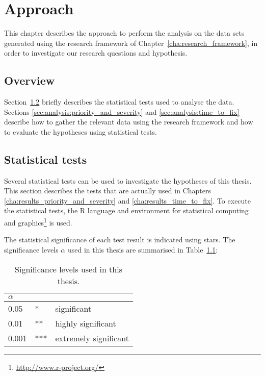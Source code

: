 
\chapter{Approach} %
\label{cha:data_analysis}
This chapter describes the approach to perform the analysis on the data sets generated using the research framework of Chapter~\ref{cha:research_framework}, in order to investigate our research questions and hypothesis.

\section{Overview} %
\label{sec:overview}
Section~\ref{sec:statistical_tests} briefly describes the statistical tests used to analyse the data. Sections \ref{sec:analysis:priority_and_severity} and \ref{sec:analysis:time_to_fix} describe how to gather the relevant data using the research framework and how to evaluate the hypotheses using statistical tests.

\section{Statistical tests} %
\label{sec:statistical_tests}
Several statistical tests can be used to investigate the hypotheses of this thesis. This section describes the tests that are actually used in Chapters \ref{cha:results_priority_and_severity} and \ref{cha:results_time_to_fix}. To execute the statistical tests, the R language and environment for statistical computing and graphics\footnote{\url{http://www.r-project.org/}} is used.

The statistical significance of each test result is indicated using stars. The significance levels $\alpha$ used in this thesis are summarised in Table~\ref{tab:sig_levels}:

\begin{table}[!ht]\footnotesize
	\centering
	\begin{tabular}{lll}
		\toprule
		$\alpha$ \\
		\midrule
		0.05 & * & significant\\
		0.01 & ** & highly significant\\
		0.001 & *** & extremely significant\\
		\bottomrule
	\end{tabular} 
	\caption{Significance levels used in this thesis.}
	\label{tab:sig_levels}
\end{table}

